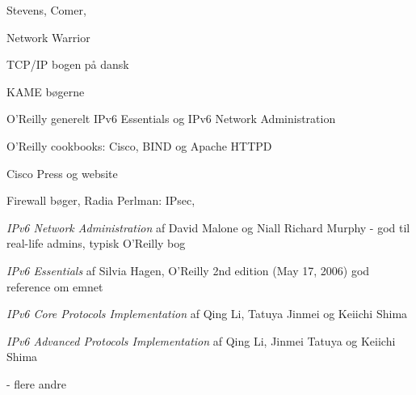 \documentclass[Screen16to9,17pt]{foils}
\begin{document}

\begin{list2}
\item Stevens, Comer,
\item Network Warrior
\item TCP/IP bogen på dansk
\item KAME bøgerne
\item O'Reilly generelt IPv6 Essentials og IPv6 Network Administration
\item O'Reilly cookbooks: Cisco, BIND og Apache HTTPD
\item Cisco Press og website
\item Firewall bøger, Radia Perlman: IPsec,
\end{list2}


\begin{list1}
\item \emph{IPv6 Network Administration}
af David Malone og Niall Richard Murphy
 - god til real-life admins, typisk
O'Reilly bog
\item \emph{IPv6 Essentials} af Silvia Hagen, O'Reilly 2nd edition (May 17, 2006)
	god reference om emnet
\item \emph{IPv6 Core Protocols Implementation}
af Qing Li, Tatuya Jinmei og Keiichi Shima
\item \emph{IPv6 Advanced Protocols Implementation}
af Qing Li, Jinmei Tatuya og Keiichi Shima
\item - flere andre
\end{list1}


% 
\end{document}
